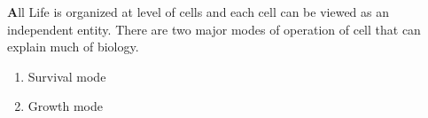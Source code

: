 \textbf
All Life is organized at level of cells and each cell can be viewed as an independent entity. There are two major modes of operation of cell that can explain much of biology.
\begin{enumerate}
\item Survival mode
\item Growth mode
\end{enumerate}